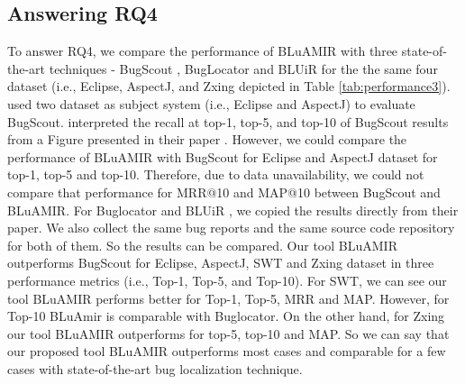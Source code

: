 \documentclass[conference]{IEEEtran}
\begin{document}

\subsection{Answering RQ4}\label{RQ4answer}
To answer RQ4, we compare the performance of BLuAMIR with three state-of-the-art techniques - BugScout \cite{Nguyen}, BugLocator \cite{Jian} and BLUiR \cite{Saha} for the the same four dataset (i.e., Eclipse, AspectJ, and Zxing depicted in Table \ref{tab:performance3}). 
\citet{Nguyen} used two dataset as subject system (i.e., Eclipse and AspectJ) to evaluate BugScout. 
\citet{Saha} interpreted the recall at top-1, top-5, and top-10 of BugScout \cite{Nguyen} results from a Figure presented in their paper \cite{Nguyen}. However, we could compare the performance of BLuAMIR with BugScout for Eclipse and AspectJ dataset for top-1, top-5 and top-10. Therefore, due to data unavailability, we could not compare that performance for MRR@10 and MAP@10 between BugScout and BLuAMIR.
For Buglocator \cite{Jian} and BLUiR \cite{Saha}, we copied the results directly from their paper. We also collect the same bug reports and the same source code repository for both of them. So the results can be compared. 
Our tool BLuAMIR outperforms BugScout \cite{Nguyen} for Eclipse, AspectJ, SWT and Zxing dataset in three performance metrics (i.e., Top-1, Top-5, and Top-10). 
For SWT, we can see our tool BLuAMIR performs better for Top-1, Top-5, MRR and MAP. However, for Top-10 BLuAmir is comparable with Buglocator. On the other hand, for Zxing our tool BLuAMIR outperforms for top-5, top-10 and MAP. So we can say that our proposed tool BLuAMIR outperforms most cases and comparable for a few cases with state-of-the-art bug localization technique.
\end{document}
